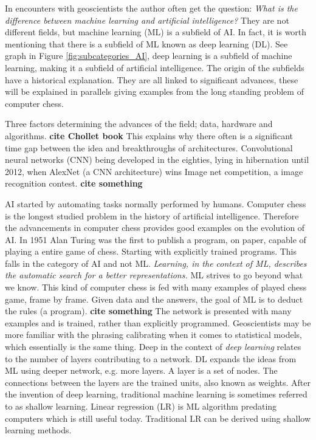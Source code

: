 \documentclass{article}
\begin{document}
In encounters with geoscientists the author often get the question: \textit{What is the difference between machine learning and artificial intelligence?} They are not different fields, but machine learning (ML) is a subfield of AI. In fact, it is worth mentioning that there is a subfield of ML known as deep learning (DL). See graph in Figure \ref{fig:subcategories_AI}, deep learning is a subfield of machine learning, making it a subfield of artificial intelligence. %
The origin of the subfields have a historical explanation. They are all linked to significant advances, these will be explained in parallels giving examples from the long standing problem of computer chess. 

Three factors determining the advances of the field; data, hardware and algorithms. \textbf{cite Chollet book} This explains why there often is a significant time gap between the idea and breakthroughs of architectures. Convolutional neural networks (CNN) being developed in the eighties, lying in hibernation until 2012, when AlexNet (a CNN architecture) wins Image net competition, a image recognition contest. \textbf{cite something} %

AI started by automating tasks normally performed by humans. Computer chess is the longest studied problem in the history of artificial intelligence. Therefore the advancements in computer chess provides good examples on the evolution of AI. In 1951 Alan Turing was the first to publish a program, on paper, capable of playing a entire game of chess. Starting with explicitly trained programs. This falls in the category of AI and not ML. \textit{Learning, in the context of ML, describes the automatic search for a better representations.} ML strives to go beyond what we know. This kind of computer chess is fed with many examples of played chess game, frame by frame. Given data and the answers, the goal of ML is to deduct the rules (a program). \textbf{cite something}
The network is presented with many examples and is trained, rather than explicitly programmed. Geoscientists may be more familiar with the phrasing calibrating when it comes to statistical models, which essentially is the same thing. Deep in the context of \textit{deep learning} relates to the number of layers contributing to a network. DL expands the ideas from ML using deeper network, e.g. more layers. A layer is a set of nodes. The connections between the layers are the trained units, also known as weights. After the invention of deep learning, traditional machine learning is sometimes referred to as shallow learning. Linear regression (LR) is ML algorithm predating computers which is still useful today. Traditional LR can be derived using shallow learning methods.
\end{document}
